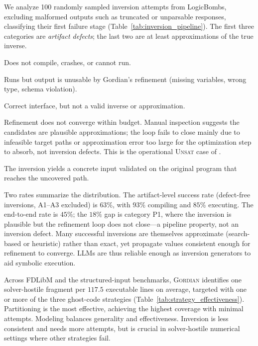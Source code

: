 \documentclass[acmsmall]{acmart}
\newenvironment{revblock}{\color{red}}{}
\newenvironment{revblock}{}{}
\newcommand{\projName}{\textsc{Gordian}\xspace}
\theoremstyle{definition}
\begin{document}
\begin{revblock}
We analyze 100 randomly sampled inversion attempts from LogicBombs, excluding malformed outputs such as truncated or unparsable responses, classifying their first failure stage (Table~\ref{tab:inversion_pipeline}). The first three categories are \emph{artifact defects}; the last two are at least approximations of the true inverse.

\begin{description}\itemsep1pt
\item[(A1) Generation/execution failure (7\%).] Does not compile, crashes, or cannot run.
\item[(A2) Interface mismatch (8\%).] Runs but output is unusable by Gordian's refinement (missing variables, wrong type, schema violation).
\item[(A3) Semantically invalid (22\%).] Correct interface, but not a valid inverse or approximation.
\item[(P1) Non-convergence (18\%).] Refinement does not converge within budget. Manual inspection suggests the candidates are plausible approximations; the loop fails to close mainly due to infeasible target paths or approximation error too large for the optimization step to absorb, not inversion defects. This is the operational \textsc{Unsat} case of .
\item[(P2) Successful path trigger (45\%).] The inversion yields a concrete input validated on the original program that reaches the uncovered path.
\end{description}

Two rates summarize the distribution. The artifact-level success rate (defect-free inversions, A1--A3 excluded) is $63\%$, with $93\%$ compiling and $85\%$ executing. The end-to-end rate is $45\%$; the $18\%$ gap is category P1, where the inversion is plausible but the refinement loop does not close---a pipeline property, not an inversion defect. Many successful inversions are themselves approximate (search-based or heuristic) rather than exact, yet propagate values consistent enough for refinement to converge. LLMs are thus reliable enough as inversion generators to aid symbolic execution.


Across FDLibM and the structured-input benchmarks, \projName{} identifies one solver-hostile fragment per \(117.5\) executable lines on average, targeted with one or more of the three ghost-code strategies (Table~\ref{tab:strategy_effectiveness}). Partitioning is the most effective, achieving the highest coverage with minimal attempts. Modeling balances generality and effectiveness. Inversion is less consistent and needs more attempts, but is crucial in solver-hostile numerical settings where other strategies fail.
\end{revblock}
\end{document}
